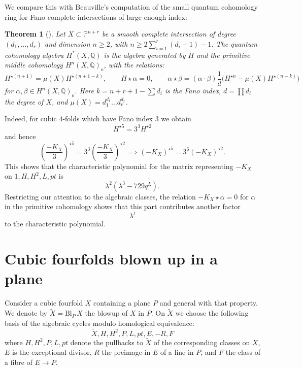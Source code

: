 \documentclass[11pt]{amsart}
\theoremstyle{plain}
\newtheorem{theorem}{Theorem}[section]
\numberwithin{equation}{section}
\theoremstyle{definition}
\theoremstyle{remark}
\begin{document}
We compare this with Beauville's computation of the small quantum cohomology ring for Fano complete intersections of large enough index:


\begin{theorem}[{{\cite{Beau97}}}]\label{tBeauville}
Let $X \subset \mathbb{P}^{n+r}$ be a smooth complete intersection of degree $(d_1, \ldots, d_r)$ and dimension $n \geq 2$, with $n \geq 2\sum_{i=1}^r (d_i - 1) - 1$. The quantum cohomology algebra $H^*(X, \mathbb{Q})$ is the algebra generated by $H$ and the primitive middle cohomology $H^n(X, \mathbb{Q})_o$, with the relations:
\[
H^{\star(n+1)} = \mu(X) H^{\star(n+1-k)}, \quad\quad
H \star \alpha = 0, \quad\quad
\alpha \star \beta = (\alpha \cdot \beta) \frac{1}{d} \big( H^{\star n} - \mu(X) H^{\star(n-k)} \big)
\]
for $\alpha, \beta \in H^n(X, \mathbb{Q})_o$. Here $k = n + r + 1 - \sum d_i$ is the Fano index,  $d = \prod d_i$ the degree of $X$, and $\mu(X) = d_1^{d_1} \dots d_r^{d_r}$.
\end{theorem}

Indeed, for cubic $4$-folds which have Fano index $3$ we obtain
\[
    H^{\star 5} = 3^3 H^{\star 2} %
\]
and hence
\[
    \left(\frac{-K_X}{3}\right)^{\star 5} 
    = 3^3 \left(\frac{-K_X}{3}\right)^{\star 2} 
    \implies (-K_X)^{\star 5} = 3^6 (-K_X)^{\star 2}.
\]
This shows that the characteristic polynomial for the matrix representing $-K_X$ on $1, H, H^2, L, pt$ is
\[
    \lambda^2(\lambda^3 - 729 q^L).
\]
Restricting our attention to the algebraic classes, the relation $-K_X \star \alpha = 0$ for $\alpha$ in the primitive cohomology shows that this part contributes another factor
\[
    \lambda^t
\]
to the characteristic polynomial.


\section{Cubic fourfolds blown up in a plane}\label{sPlane}

Consider a cubic fourfold $X$ containing a plane $P$ and general with that property. We denote by $\widetilde{X} = \mathrm{Bl}_P \, X$ the blowup of $X$ in $P$. On $\widetilde{X}$ we choose the following basis of the algebraic cycles modulo homological equivalence:
\[
\widetilde{X}, H, H^2, P, L, pt, E, -R, F
\]
where $H, H^2, P, L, pt$ denote the pullbacks to $\widetilde{X}$ of the corresponding classes on $X$, $E$ is the exceptional divisor, $R$ the preimage in $E$ of a line in $P$, and $F$ the class of a fibre of $E \to P$. 
\end{document}
